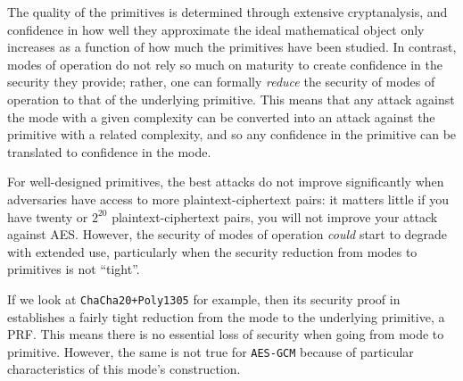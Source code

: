 \documentclass{article}
\begin{document}
The quality of the primitives is determined through extensive cryptanalysis, and confidence in how well they approximate the ideal mathematical object only increases as a function of how much the primitives have been studied. In contrast, modes of operation do not rely so much on maturity to create confidence in the security they provide; rather, one can formally \emph{reduce} the security of modes of operation to that of the underlying primitive. This means that any attack against the mode with a given complexity can be converted into an attack against the primitive with a related complexity, and so any confidence in the primitive can be translated to confidence in the mode.

For well-designed primitives, the best attacks do not improve significantly when adversaries have access to more plaintext-ciphertext pairs: it matters little if you have twenty or $2^{20}$ plaintext-ciphertext pairs, you will not improve your attack against AES. However, the security of modes of operation \emph{could} start to degrade with extended use, particularly when the security reduction from modes to primitives is not ``tight''.

If we look at \texttt{ChaCha20+Poly1305} for example, then its security proof in~\cite{cryptoeprint:2014:613} establishes a fairly tight reduction from the mode to the underlying primitive, a PRF. This means there is no essential loss of security when going from mode to primitive. 
However, the same is not true for \texttt{AES-GCM} because of particular characteristics of this mode's construction.



\end{document}
